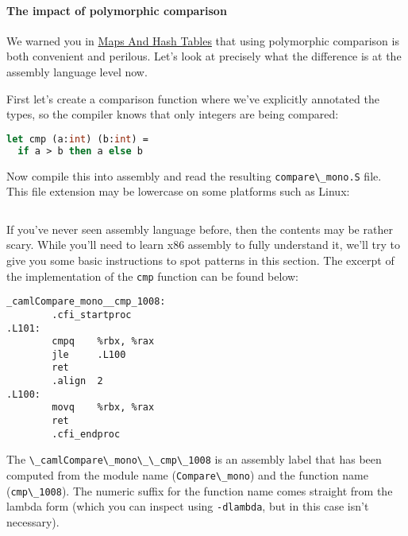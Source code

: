 \hypertarget{the-impact-of-polymorphic-comparison}{%
\paragraph{The impact of polymorphic
comparison}\label{the-impact-of-polymorphic-comparison}}

We warned you in
\href{maps-and-hashtables.html\#maps-and-hash-tables}{Maps And Hash
Tables} that using polymorphic comparison is both convenient and
perilous. Let's look at precisely what the difference is at the assembly
language level now.

First let's create a comparison function where we've explicitly
annotated the types, so the compiler knows that only integers are being
compared:

\begin{lstlisting}[language=Caml]
let cmp (a:int) (b:int) =
  if a > b then a else b
\end{lstlisting}

Now compile this into assembly and read the resulting
\passthrough{\lstinline!compare\_mono.S!} file. This file extension may
be lowercase on some platforms such as Linux:

\begin{lstlisting}[language=bash]
\end{lstlisting}

If you've never seen assembly language before, then the contents may be
rather scary. While you'll need to learn x86 assembly to fully
understand it, we'll try to give you some basic instructions to spot
patterns in this section. The excerpt of the implementation of the
\passthrough{\lstinline!cmp!} function can be found below:

\begin{lstlisting}
_camlCompare_mono__cmp_1008:
        .cfi_startproc
.L101:
        cmpq    %rbx, %rax
        jle     .L100
        ret
        .align  2
.L100:
        movq    %rbx, %rax
        ret
        .cfi_endproc
\end{lstlisting}

The \passthrough{\lstinline!\_camlCompare\_mono\_\_cmp\_1008!} is an
assembly label that has been computed from the module name
(\passthrough{\lstinline!Compare\_mono!}) and the function name
(\passthrough{\lstinline!cmp\_1008!}). The numeric suffix for the
function name comes straight from the lambda form (which you can inspect
using \passthrough{\lstinline!-dlambda!}, but in this case isn't
necessary).

